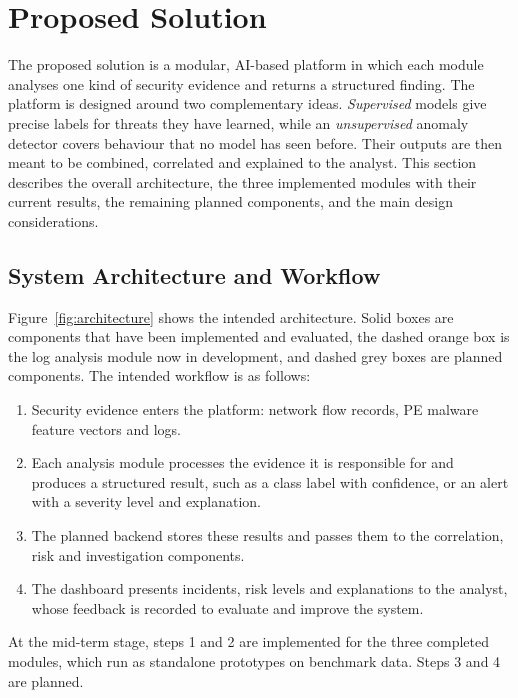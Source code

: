 \section{Proposed Solution}

The proposed solution is a modular, AI-based platform in which each module analyses one kind of security evidence and returns a structured finding. The platform is designed around two complementary ideas. \textit{Supervised} models give precise labels for threats they have learned, while an \textit{unsupervised} anomaly detector covers behaviour that no model has seen before. Their outputs are then meant to be combined, correlated and explained to the analyst. This section describes the overall architecture, the three implemented modules with their current results, the remaining planned components, and the main design considerations.

\subsection{System Architecture and Workflow}

Figure~\ref{fig:architecture} shows the intended architecture. Solid boxes are components that have been implemented and evaluated, the dashed orange box is the log analysis module now in development, and dashed grey boxes are planned components. The intended workflow is as follows:
\begin{enumerate}[itemsep=1pt, topsep=2pt]
  \item Security evidence enters the platform: network flow records, PE malware feature vectors and logs.
  \item Each analysis module processes the evidence it is responsible for and produces a structured result, such as a class label with confidence, or an alert with a severity level and explanation.
  \item The planned backend stores these results and passes them to the correlation, risk and investigation components.
  \item The dashboard presents incidents, risk levels and explanations to the analyst, whose feedback is recorded to evaluate and improve the system.
\end{enumerate}
At the mid-term stage, steps 1 and 2 are implemented for the three completed modules, which run as standalone prototypes on benchmark data. Steps 3 and 4 are planned.

